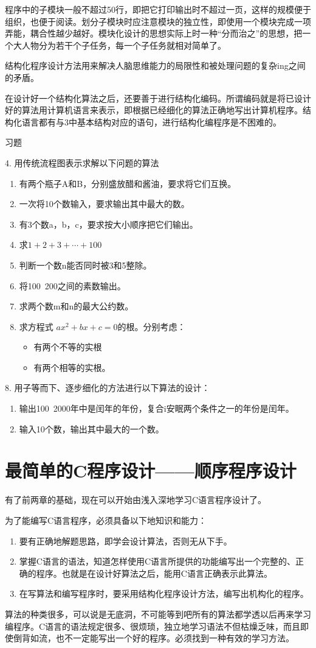 程序中的子模块一般不超过50行，即把它打印输出时不超过一页，这样的规模便于组织，也便于阅读。划分子模块时应注意模块的独立性，即使用一个模块完成一项弄能，耦合性越少越好。模块化设计的思想实际上时一种“分而治之”的思想，把一个大人物分为若干个子任务，每一个子任务就相对简单了。

结构化程序设计方法用来解决人脑思维能力的局限性和被处理问题的复杂ing之间的矛盾。

在设计好一个结构化算法之后，还要善于进行结构化编码。所谓编码就是将已设计好的算法用计算机语言来表示，即根据已经细化的算法正确地写出计算机程序。结构化语言都有与3中基本结构对应的语句，进行结构化编程序是不困难的。

习题

4. 用传统流程图表示求解以下问题的算法
\begin{enumerate}
	\item 有两个瓶子A和B，分别盛放醋和酱油，要求将它们互换。
	\item 一次将10个数输入，要求输出其中最大的数。
	\item 有3个数a，b，c，要求按大小顺序把它们输出。
	\item 求$1 + 2 + 3 + \cdots + 100$
	\item 判断一个数n能否同时被3和5整除。
	\item 将100~200之间的素数输出。
	\item 求两个数m和n的最大公约数。
	\item 求方程式 $ax^2 + bx + c = 0$的根。分别考虑：
		\begin{itemize}
			\item 有两个不等的实根
			\item 有两个相等的实根。
		\end{itemize}
\end{enumerate}
8. 用子等而下、逐步细化的方法进行以下算法的设计：
\begin{enumerate}
	\item 输出100~2000年中是闰年的年份，复合i安眠两个条件之一的年份是闰年。
	\item 输入10个数，输出其中最大的一个数。
\end{enumerate}

\chapter{最简单的C程序设计——顺序程序设计}

有了前两章的基础，现在可以开始由浅入深地学习C语言程序设计了。

为了能编写C语言程序，必须具备以下地知识和能力：
\begin{enumerate}
	\item 要有正确地解题思路，即学会设计算法，否则无从下手。
	\item 掌握C语言的语法，知道怎样使用C语言所提供的功能编写出一个完整的、正确的程序。也就是在设计好算法之后，能用C语言正确表示此算法。
	\item 在写算法和编写程序时，要采用结构化程序设计方法，编写出机构化的程序。
\end{enumerate}
算法的种类很多，可以说是无底洞，不可能等到吧所有的算法都学透以后再来学习编程序。C语言的语法规定很多、很烦琐，独立地学习语法不但枯燥乏味，而且即使倒背如流，也不一定能写出一个好的程序。必须找到一种有效的学习方法。

